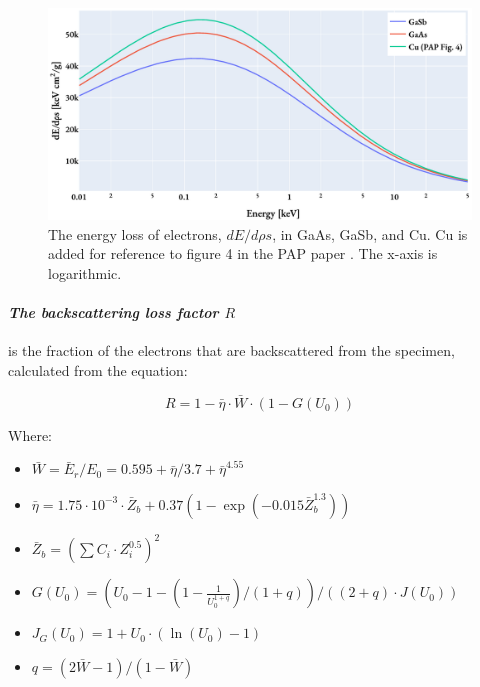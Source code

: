 \begin{figure}[htbp]
    \centering
    \includegraphics[width=0.8\linewidth]{figures/PAP_energy_loss_dE_drhos.pdf}
    \caption{
        The energy loss of electrons, $dE/d\rho s$,  in GaAs, GaSb, and Cu.
        Cu is added for reference to figure 4 in the PAP paper \cite{pap_1991}.
        The x-axis is logarithmic.
    }
    \label{fig:PAP:energy_loss_electrons_dE_drhos}
\end{figure}





\paragraph*{\emph{The backscattering loss factor $R$}} is the fraction of the electrons that are backscattered from the specimen, calculated from the equation:

\begin{equation}
    \label{eq:theory:quantitative:pap:calculation_of_F:R}
    R = 1- \bar{\eta}  \cdot \bar{W} \cdot (1-G(U_0))
\end{equation}

Where:

\begin{itemize}
    \item  $\bar{W} = \bar{E}_r/E_0 = 0.595 + \bar{\eta}/3.7 + \bar{\eta}^{4.55} $
    \item  $\bar{\eta} = 1.75 \cdot 10^{-3} \cdot \bar{Z}_b + 0.37(1-\exp(-0.015\bar{Z}_b^{1.3})) $
    \item  $\bar{Z}_b = (\sum C_i \cdot Z_i^{0.5})^2$
    \item  $G(U_0) = (U_0 - 1 - (1- \frac{1}{U_0^{1+q}})/(1+q)) / ((2+q)\cdot J(U_0))$
    \item  $J_G(U_0) = 1 + U_0 \cdot (\ln(U_0)-1) $
    \item  $q = (2 \bar{W} - 1) / (1 - \bar{W}) $
\end{itemize}


